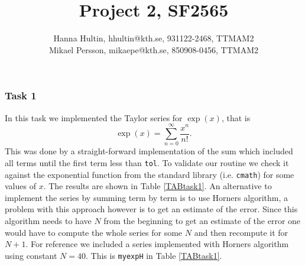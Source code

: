 \documentclass[a4paper,10pt]{article}
\title{Project 2, SF2565}
\author{Hanna Hultin, hhultin@kth.se, 931122-2468, TTMAM2 \\ Mikael Persson, mikaepe@kth.se, 850908-0456, TTMAM2}
\begin{document}
\maketitle

\subsubsection*{Task 1}
In this task we implemented the Taylor series for $\exp (x)$, that is 
\begin{equation*}
  \exp(x) = \sum_{n=0}^\infty \frac{x^{n}}{n!}.
\end{equation*}
This was done by a straight-forward implementation of the 
sum which included all terms until the first term less than \texttt{tol}.
To validate our routine we check it against the exponential function from the 
standard library (i.e. \texttt{cmath}) for some values of $x$. 
The results are shown in Table \ref{TABtask1}.
An alternative to implement the series by summing term by term is to use Horners algorithm, 
a problem with this approach however is to get an estimate of the error. Since this algorithm 
needs to have $N$ from the beginning to get an estimate of the error one would have to compute the
whole series for some $N$ and then recompute it for $N+1$. For reference we included 
a series implemented with Horners algorithm using constant $N = 40$. This is 
\texttt{myexpH} in Table \ref{TABtask1}.
\end{document}
